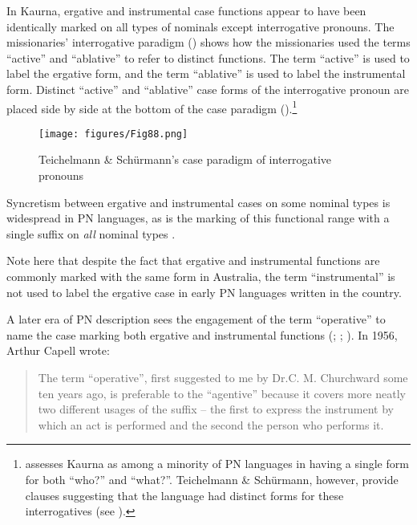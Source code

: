 In Kaurna, ergative and instrumental case functions appear to have been identically marked on all types of nominals except interrogative pronouns. The missionaries' interrogative paradigm () shows how the missionaries used the terms “active” and “ablative” to refer to distinct functions. The term “active” is used to label the ergative form, and the term “ablative” is used to label the instrumental form. Distinct “active” and “ablative” case forms of the interrogative pronoun are placed side by side at the bottom of the case paradigm ().\footnote{ \citet[328]{dixon_australian_2002} assesses Kaurna as among a minority of PN languages in having a single form for both “who?” and ``what?''. Teichelmann \& Schürmann, however, provide clauses suggesting that the language had distinct forms for these interrogatives (see \citeyear[141--148]{amery_kulurdu_2013}).}
 
\begin{figure}
\texttt{[image: figures/Fig88.png]}
\caption{\label{fig:5:88}Teichelmann \& Schürmann’s case paradigm of interrogative pronouns \citeyearpar[9]{teichelmann_outlines_1840}}
\end{figure}


\largerpage
Syncretism between ergative and instrumental cases on some nominal types is widespread in PN languages, as is the marking of this functional range with a single suffix on \textit{all} nominal types \citep[135]{dixon_australian_2002}.

Note here that despite the fact that ergative and instrumental functions are commonly marked with the same form in Australia, the term “instrumental” is not used to label the ergative case in early PN languages written in the country. 

A later era of PN description sees the engagement of the term “operative” to name the case marking both ergative and instrumental functions (\citealt{smythe1949}; \citealt{hercus_languages_1969}; \citealt{blake_pitta-pitta_1971}). In 1956, Arthur Capell wrote:

\begin{quote}
    The term ``operative'', first suggested to me by Dr.C. M. Churchward some ten years ago, is preferable to the “agentive” because it covers more neatly two different usages of the suffix – the first to express the instrument by which an act is performed and the second the person who performs it. \citep[63--64]{capell_new_1956}
\end{quote}
 
